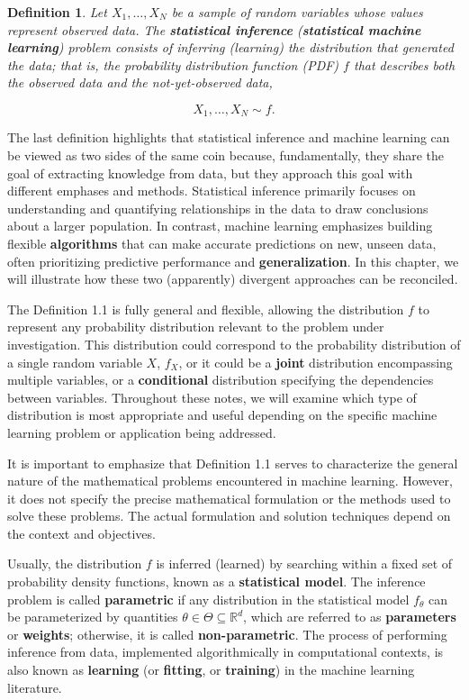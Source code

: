 \documentclass{report}
\newtheorem{definition}{Definition}[chapter]
\begin{document}
\begin{definition}
Let $X_1,\dots,X_N$ be a sample of random variables whose values represent observed data. The \textbf{statistical inference} (\textbf{statistical machine learning}) problem consists of inferring (learning) the distribution that generated the data; that is, the probability distribution function (PDF) $f$ that describes both the observed data and the not-yet-observed data,

\begin{equation*}
X_1,\dots,X_N \sim f.
\end{equation*}
\end{definition}
The last definition highlights that statistical inference and machine learning can be viewed as two sides of the same coin because, fundamentally, they share the goal of extracting knowledge from data, but they approach this goal with different emphases and methods.  Statistical inference primarily focuses on understanding and quantifying relationships in the data to draw conclusions about a larger population. In contrast, machine learning emphasizes building flexible \textbf{algorithms} that can make accurate predictions on new, unseen data, often prioritizing predictive performance and \textbf{generalization}. In this chapter, we will illustrate how these two (apparently) divergent approaches can be reconciled.

The Definition 1.1 is fully general and flexible, allowing the distribution $f$ to represent any probability distribution relevant to the problem under investigation. This distribution could correspond to the probability distribution of a single random variable $X$, $f_X$, or it could be a \textbf{joint} distribution encompassing multiple variables, or a \textbf{conditional} distribution specifying the dependencies between variables. Throughout these notes, we will examine which type of distribution is most appropriate and useful depending on the specific machine learning problem or application being addressed.

It is important to emphasize that Definition 1.1 serves to characterize the general nature of the mathematical problems encountered in machine learning. However, it does not specify the precise mathematical formulation or the methods used to solve these problems. The actual formulation and solution techniques depend on the context and objectives.

Usually, the distribution $f$ is inferred (learned) by searching within a fixed set of probability density functions, known as a \textbf{statistical model}. The inference problem is called \textbf{parametric} if any distribution in the statistical model $f_\theta$ can be parameterized by quantities $\theta \in \Theta \subseteq \mathbb{R}^d$, which are referred to as \textbf{parameters} or \textbf{weights}; otherwise, it is called \textbf{non-parametric}. The process of performing inference from data, implemented algorithmically in computational contexts, is also known as \textbf{learning} (or \textbf{fitting}, or \textbf{training}) in the machine learning literature.
\end{document}
